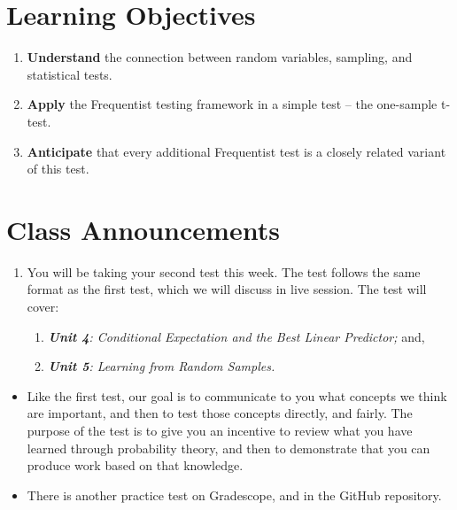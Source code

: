 \documentclass[
]{book}
\providecommand{\tightlist}{%
  \setlength{\itemsep}{0pt}\setlength{\parskip}{0pt}}
\theoremstyle{definition}
\theoremstyle{definition}
\theoremstyle{definition}
\theoremstyle{definition}
\theoremstyle{remark}
\begin{document}
\section{Learning Objectives}\label{learning-objectives-5}

\begin{enumerate}
\def\labelenumi{\arabic{enumi}.}
\tightlist
\item
  \textbf{Understand} the connection between random variables, sampling, and statistical tests.
\item
  \textbf{Apply} the Frequentist testing framework in a simple test -- the one-sample t-test.
\item
  \textbf{Anticipate} that every additional Frequentist test is a closely related variant of this test.
\end{enumerate}

\section{Class Announcements}\label{class-announcements-4}

\begin{enumerate}
\def\labelenumi{\arabic{enumi}.}
\tightlist
\item
  You will be taking your second test this week. The test follows the same format as the first test, which we will discuss in live session. The test will cover:

  \begin{enumerate}
  \def\labelenumii{\arabic{enumii}.}
  \item
    \emph{\textbf{Unit 4}: Conditional Expectation and the Best Linear Predictor;} and,
  \item
    \emph{\textbf{Unit 5}: Learning from Random Samples.}
  \end{enumerate}
\end{enumerate}

\begin{itemize}
\tightlist
\item
  Like the first test, our goal is to communicate to you what concepts we think are important, and then to test those concepts directly, and fairly. The purpose of the test is to give you an incentive to review what you have learned through probability theory, and then to demonstrate that you can produce work based on that knowledge.
\item
  There is another practice test on Gradescope, and in the GitHub repository.
\end{itemize}
\end{document}

